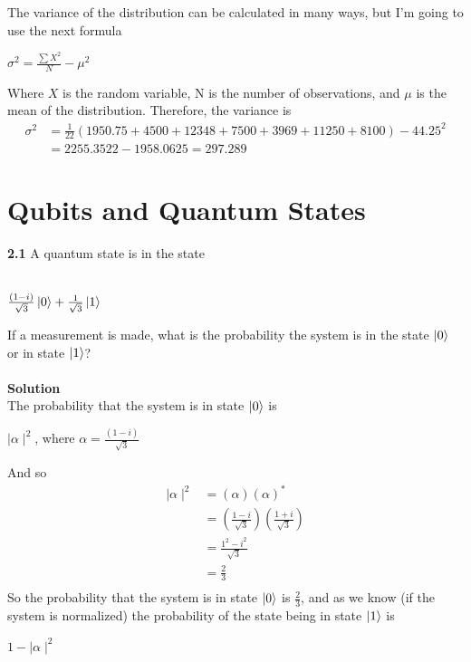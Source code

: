 \documentclass{article}
\begin{document}
The variance of the distribution can be calculated in many ways, but I'm going to use the next formula\\
\begin{center}
$\sigma^2 = \frac{\sum X^2}{N} - \mu^2$
\end{center}
Where $X$ is the random variable, N is the number of observations, and $\mu$ is the mean of the distribution. Therefore, the variance  is\\
\begin{align*}
\sigma^2 &= \frac{1}{22}(1950.75 + 4500 + 12348 + 7500 + 3969 + 11250 + 8100) - 44.25^2\\
&= 2255.3522 - 1958.0625 = 297.289
\end{align*}

\section{Qubits and Quantum States}
\textbf{2.1} A quantum state is in the state\\ \\
\begin{center}
$\frac{(1 - i)}{\sqrt{3}}\ket{0} + \frac{1}{\sqrt{3}}\ket{1}$\\
\end{center}
If a measurement is made, what is the probability the system is in the state $\ket{0}$ or in state $\ket{1}$?\\ \\
\textbf{Solution}\\
The probability that the system is in state $\ket{0}$ is\\
\begin{center}
$\mid\alpha\mid ^2$, where $\alpha = \frac{(1 - i)}{\sqrt{3}}$\\
\end{center}
And so\\
\begin{align*}
\mid\alpha\mid ^2 &= (\alpha)(\alpha)^*\\
&= (\frac{1 - i}{\sqrt{3}})(\frac{1 + i}{\sqrt{3}})\\
&= \frac{1^2 - i^2}{\sqrt{3}}\\
&= \frac{2}{3}\\
\end{align*}
So the probability that the system is in state $\ket{0}$ is $\frac{2}{3}$, and as we know (if the system is normalized) the probability of the state being in state $\ket{1}$ is\\
\begin{center}
$1 - \mid\alpha\mid ^2$\\
\end{center}
\end{document}
